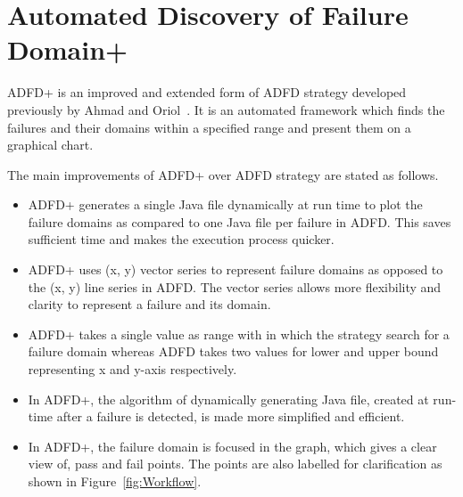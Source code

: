 


 


\section{Automated Discovery of Failure Domain+}\label{sec:adfd+}\label{sec:intro6_2}
ADFD+ is an improved and extended form of ADFD strategy developed previously by Ahmad and Oriol~\cite{ahmad2013adfd}. It is an automated framework which finds the failures and their domains within a specified range and present them on a graphical chart. 

The main improvements of ADFD+ over ADFD strategy are stated as follows.

\begin{itemize}
\item ADFD+ generates a single Java file dynamically at run time to plot the failure domains as compared to one Java file per failure in ADFD. This saves sufficient time and makes the execution process quicker.

\item ADFD+ uses (x, y) vector series to represent failure domains as opposed to the (x, y) line series in ADFD. The vector series allows more flexibility and clarity to represent a failure and its domain.   

\item ADFD+ takes a single value as range with in which the strategy search for a failure domain whereas ADFD takes two values for lower and upper bound representing x and y-axis respectively.

\item In ADFD+, the algorithm of dynamically generating Java file, created at run-time after a failure is detected, is made more simplified and efficient.

\item In ADFD+, the failure domain is focused in the graph, which gives a clear view of, pass and fail points. The points are also labelled for clarification as shown in Figure~\ref{fig:Workflow}. 

\end{itemize}


